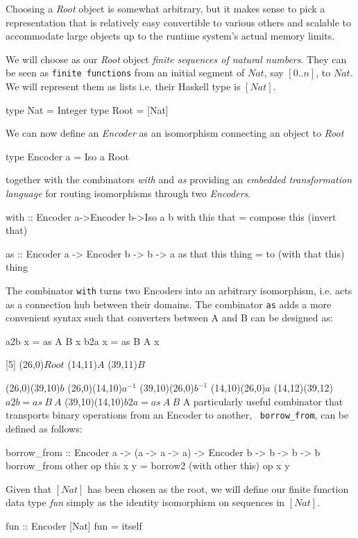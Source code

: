 Choosing a {\em Root} object is somewhat arbitrary, but it makes sense to
pick a representation that is relatively easy convertible to various
others and scalable to
accommodate large objects up to the runtime system's 
actual memory limits.

We will choose as our {\em Root} object {\em finite sequences of natural
numbers}. They can be seen as {\tt finite functions} from an initial 
segment of $Nat$, say $[0..n]$, to $Nat$.
We will represent them as lists i.e. their Haskell type is $[Nat]$.
\begin{code}
type Nat = Integer
type Root = [Nat]
\end{code}
We can now define an {\em Encoder} as an isomorphism
connecting an object to {\em Root} 
\begin{code}
type Encoder a = Iso a Root
\end{code}
together with the combinators {\em with} and {\em as}
providing an {\em embedded transformation language} for routing
isomorphisms through two {\em Encoders}.
\begin{code}  
with :: Encoder a->Encoder b->Iso a b
with this that = compose this (invert that)

as :: Encoder a -> Encoder b -> b -> a
as that this thing = to (with that this) thing
\end{code}
The combinator {\tt with} turns two Encoders
into an arbitrary isomorphism, i.e. acts as a connection hub between
their domains. The combinator {\tt as} adds a more convenient syntax
such that converters between A and B can be designed as:
\begin{codex}
a2b x = as A B x
b2a x = as B A x
\end{codex}
\vskip 0.30cm
\begindc{\commdiag}[5]
\obj(26,0){$Root$}
\obj(14,11){$A$}
\obj(39,11){$B$}

\mor(26,0)(39,10){$b$}
\mor(26,0)(14,10){$a^{-1}$}
\mor(39,10)(26,0){$b^{-1}$}
\mor(14,10)(26,0){$a$}
\mor(14,12)(39,12){$a2b=as~B~A$}
\mor(39,10)(14,10){$b2a=as~A~B$}
\enddc
\vskip 0.30cm
A particularly useful combinator that
transports binary operations from an Encoder to another, {\tt
borrow\_from}, can be defined as follows:
\begin{code}
borrow_from :: Encoder a -> (a -> a -> a) -> Encoder b -> b -> b -> b
borrow_from other op this x y = borrow2 (with other this) op x y
\end{code}
\noindent Given that $[Nat]$ has been chosen as the root, we will define our
finite function data type {\em fun} simply as the identity isomorphism 
on sequences in $[Nat]$.
\begin{code}  
fun :: Encoder [Nat]
fun = itself
\end{code}
%
